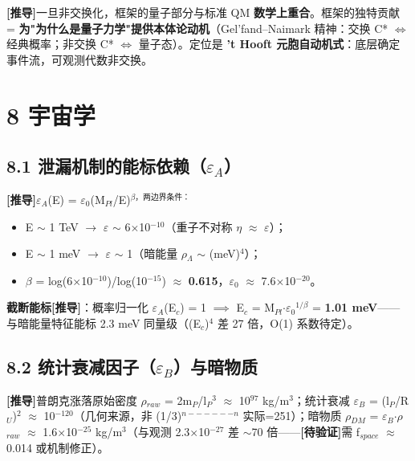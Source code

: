 \documentclass[12pt]{article}
\newcommand{\mtag}[1]{\textbf{[#1]}}
\newcommand{\up}[1]{\ensuremath{^{#1}}}
\newcommand{\down}[1]{\ensuremath{_{#1}}}
\begin{document}
\mtag{推导}一旦非交换化，框架的量子部分与标准 QM \textbf{数学上重合}。框架的独特贡献 = \textbf{为"为什么是量子力学"提供本体论动机}（Gel'fand--Naimark 精神：交换 C* \ensuremath{\iff} 经典概率；非交换 C* \ensuremath{\iff} 量子态）。定位是 \textbf{'t Hooft 元胞自动机式}：底层确定事件流，可观测代数非交换。



\section{8 宇宙学}

\subsection{8.1 泄漏机制的能标依赖（\ensuremath{\varepsilon}\down{A}）}

\mtag{推导}\ensuremath{\varepsilon}\down{A}(E) = \ensuremath{\varepsilon}\down{0}(M\down{Pl}/E)\up{\beta{}，两边界条件：}
\begin{itemize}
\item E \ensuremath{\sim} 1 TeV \ensuremath{\to} \ensuremath{\varepsilon} \ensuremath{\sim} 6\ensuremath{\times}10\up{-10}（重子不对称 \ensuremath{\eta} \ensuremath{\approx} \ensuremath{\varepsilon}）；
\item E \ensuremath{\sim} 1 meV \ensuremath{\to} \ensuremath{\varepsilon} \ensuremath{\sim} 1（暗能量 \ensuremath{\rho}\down{\Lambda{}} \ensuremath{\sim} (meV)\up{4}）；
\item \ensuremath{\beta} = log(6\ensuremath{\times}10\up{-10})/log(10\up{-15}) \ensuremath{\approx} \textbf{0.615}，\ensuremath{\varepsilon}\down{0} \ensuremath{\approx} 7.6\ensuremath{\times}10\up{-20}。
\end{itemize}

\textbf{截断能标}\mtag{推导}：概率归一化 \ensuremath{\varepsilon}\down{A}(E\down{c}) = 1 \ensuremath{\implies} E\down{c} = M\down{Pl}\ensuremath{\cdot}\ensuremath{\varepsilon}\down{0}\up{1/\beta{}} = \textbf{1.01 meV}------与暗能量特征能标 2.3 meV 同量级（(E\down{c})\up{4} 差 27 倍，O(1) 系数待定）。

\subsection{8.2 统计衰减因子（\ensuremath{\varepsilon}\down{B}）与暗物质}

\mtag{推导}普朗克涨落原始密度 \ensuremath{\rho}\down{raw} = 2m\down{P}/l\down{P}\up{3} \ensuremath{\approx} 10\up{97} kg/m\up{3}；统计衰减 \ensuremath{\varepsilon}\down{B} = (l\down{P}/R\down{U})\up{2} \ensuremath{\approx} 10\up{-120}（几何来源，非 (1/3)\up{n------n} 实际=251）；暗物质 \ensuremath{\rho}\down{DM} = \ensuremath{\varepsilon}\down{B}\ensuremath{\cdot}\ensuremath{\rho}\down{raw} \ensuremath{\approx} 1.6\ensuremath{\times}10\up{-25} kg/m\up{3}（与观测 2.3\ensuremath{\times}10\up{-27} 差 \ensuremath{\sim}70 倍------\textbf{\mtag{待验证}}需 f\down{space} \ensuremath{\approx} 0.014 或机制修正）。
\end{document}
